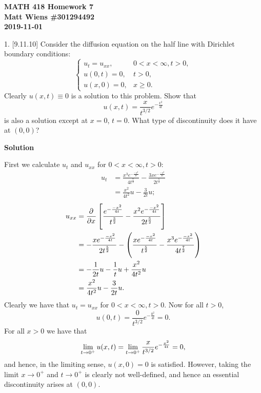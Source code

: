 \documentclass{article}
\begin{document}
\textbf{MATH 418 Homework 7} \\
\textbf{Matt Wiens \#301294492} \\
\textbf{2019-11-01}

1. [9.11.10] Consider the diffusion equation on the half line with
Dirichlet boundary conditions:
%
\begin{equation*}
    \begin{cases}
        u_t = u_{xx}, & 0 < x < \infty, t > 0, \\
        u(0, t) = 0, & t > 0, \\
        u(x, 0) = 0, & x \geq 0.
    \end{cases}
\end{equation*}
%
Clearly $u(x, t) \equiv 0$ is a solution to this problem. Show that
%
\begin{equation*}
    u(x, t) = \frac{x}{t^{3/2}} e^{- \frac{x^2}{4 t}}
\end{equation*}
%
is also a solution except at $x = 0$, $t = 0$. What type of
discontinuity does it have at $(0, 0)$?

\textbf{Solution}

First we calculate $u_t$ and $u_{xx}$ for $0 < x < \infty, t > 0$:
%
\begin{align*}
    u_t &= \frac{x^3 e^{-\frac{-x^2}{4 t}}}{4 t^{\frac{7}{2}}}
            - \frac{3 x e^{-\frac{-x^2}{4 t}}}{2 t^{\frac{5}{2}}} \\
        &= \frac{x^2}{4 t^2} u - \frac{3}{2 t} u
        ;
\end{align*}
%
\begin{align*}
    u_{xx}
        &= \dpd{}{x} \sbr{
            \frac{e^{-\frac{-x^2}{4 t}}}{t^{\frac{3}{2}}}
            - \frac{x^2 e^{-\frac{-x^2}{4 t}}}{2 t^{\frac{5}{2}}}
        } \\
        &= - \frac{x e^{-\frac{-x^2}{4 t}}}{2 t^{\frac{5}{2}}}
            - \del{
                \frac{x e^{-\frac{-x^2}{4 t}}}{t^{\frac{5}{2}}}
                - \frac{x^3 e^{-\frac{-x^2}{4 t}}}{4 t^{\frac{7}{2}}}
              } \\
        &= - \frac{1}{2 t} u - \frac{1}{t} u + \frac{x^2}{4 t^2} u \\
        &= \frac{x^2}{4 t^2} u - \frac{3}{2 t} u
        .
\end{align*}
%
Clearly we have that $u_t = u_{xx}$ for $0 < x < \infty, t > 0$. Now for
all $t > 0$,
%
\begin{equation*}
    u(0, t) = \frac{0}{t^{3/2}} e^{- \frac{0^2}{4 t}} = 0
    .
\end{equation*}
%
For all $x > 0$ we have that
%
\begin{equation*}
    \lim_{t \to 0^+} u(x, t)
        = \lim_{t \to 0^+} \frac{x}{t^{3/2}} e^{- \frac{x^2}{4 t}} \\
        = 0
        ,
\end{equation*}
%
and hence, in the limiting sense, $u(x, 0) = 0$ is satisfied. However,
taking the limit $x \to 0^+$ and $t \to 0^+$ is clearly not
well-defined, and hence an essential discontinuity arises at $(0, 0)$.
\end{document}
